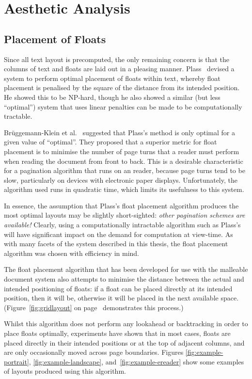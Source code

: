 \chapter{Aesthetic Analysis}\label{ch:aesthetics}

\section{Placement of Floats}
Since all text layout is precomputed, the only remaining concern is that the columns of text and floats are laid out in a pleasing manner. Plass~\cite{Plass1981} devised a system to perform optimal placement of floats within text, whereby float placement is penalised by the square of the distance from its intended position. He showed this to be NP-hard, though he also showed a similar (but less ``optimal'') system that uses linear penalties can be made to be computationally tractable.

Br\"uggemann-Klein et al.~\cite{Bruggemann-Klein1995} suggested that Plass's method is only optimal for a given value of ``optimal''. They proposed that a superior metric for float placement is to minimise the number of page turns that a reader must perform when reading the document from front to back. This is a desirable characteristic for a pagination algorithm that runs on an \ebook{} reader, because page turns tend to be slow, particularly on devices with electronic paper displays. Unfortunately, the algorithm used runs in quadratic time, which limits its usefulness to this system.

In essence, the assumption that Plass's float placement algorithm produces the most optimal layouts may be slightly short-sighted: \emph{other pagination schemes are available!} Clearly, using a computationally intractable algorithm such as Plass's will have significant impact on the demand for computation at view-time. As with many facets of the system described in this thesis, the float placement algorithm was chosen with efficiency in mind.

The float placement algorithm that has been developed for use with the malleable document system also attempts to minimise the distance between the actual and intended positioning of floats: if a float can be placed directly at its intended position, then it will be, otherwise it will be placed in the next available space. (Figure~\ref{fig:gridlayout} on page~\pageref{fig:gridlayout} demonstrates this process.)

Whilst this algorithm does not perform any lookahead or backtracking in order to place floats optimally, experiments have shown that in most cases, floats are placed directly in their intended positions or at the top of adjacent columns, and are only occasionally moved across page boundaries. Figures \ref{fig:example-portrait}, \ref{fig:example-landscape}, and~\ref{fig:example-ereader} show some examples of layouts produced using this algorithm.

